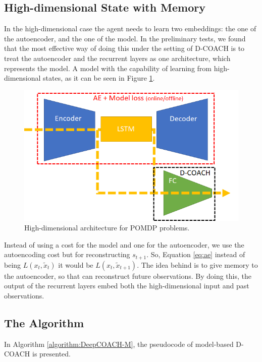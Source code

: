 \subsection{High-dimensional State with Memory}
In the high-dimensional case the agent needs to learn two embeddings: the one of the autoencoder, and the one of the model. In the preliminary tests, we found that the most effective way of doing this under the setting of D-COACH is to treat the autoencoder and the recurrent layers as one architecture, which represents the model. A model with the capability of learning from high-dimensional states, as it can be seen in Figure \ref{fig:rnn_hd}. 

\begin{figure}[h]
    \centering
    \includegraphics[width=0.6\linewidth]{imagenes/cap4/RNN_HD.png}
    \caption{High-dimensional architecture for POMDP problems.}
    \label{fig:rnn_hd}
\end{figure}

Instead of using a cost for the model and one for the autoencoder, we use the autoencoding cost but for reconstructing $s_{t+1}$. So, Equation \ref{eq:ae} instead of being $L(x_{t},\widetilde x_{t})$ it would be  $L(x_{t},\widetilde x_{t+1})$. The idea behind is to give memory to the autoencoder, so that can reconstruct future observations. By doing this, the output of the recurrent layers embed both the high-dimensional input and past observations.

\subsection{The Algorithm}

In Algorithm \ref{algorithm:DeepCOACH-M}, the pseudocode of model-based D-COACH is presented.

